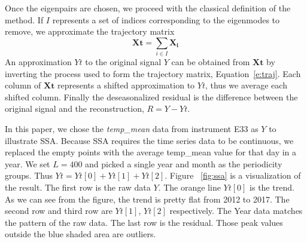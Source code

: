 %

Once the eigenpairs are chosen, we proceed with the classical definition
of the method. If $I$ represents a set of indices corresponding to the
eigenmodes to remove, we approximate the trajectory matrix
%
\begin{equation*}
    \mathbf{Xt} = \sum_{i\in I} \mathbf{X_i}
\end{equation*}
%
An approximation $Yt$ to the original signal $Y$ can be obtained from
$\mathbf{Xt}$ by inverting the process used to form the trajectory
matrix, Equation~\eqref{e:traj}. Each column of $\mathbf{Xt}$ represents
a shifted approximation to $Yt$, thus we average each shifted column.
Finally the deseasonalized residual is the difference between the
original signal and the reconstruction, $R=Y-Yt$.

In this paper, we chose the \textit{temp\_mean} data from instrument E33
as $Y$ to illustrate SSA. Because SSA requires the time series data to
be continuous, we replaced the empty points with the average temp\_mean
value for that day in a year. We set $L = 400$ and picked a single year
and month as the periodicity groups. Thus $Yt = Yt[0] + Yt[1] + Yt[2]$.
Figure~ \ref{fig:ssa} is a visualization of the result. The first row is
the raw data $Y$. The orange line $Yt[0]$ is the trend. As we can see
from the figure, the trend is pretty flat from 2012 to 2017. The second
row and third row are $Yt[1]$, $Yt[2]$ respectively. The Year data
matches the pattern of the raw data. The last row is the residual. Those
peak values outside the blue shaded area are outliers.

